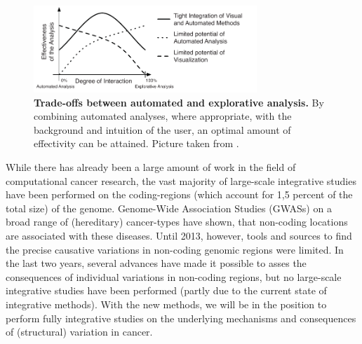\documentclass[twoside,fontsize=10pt]{article}
\begin{document}
\begin{figure}[H]
    \centering
    \includegraphics[width=0.75\textwidth]{autoVSexplo}
    \caption{\textbf{Trade-offs between automated and explorative analysis.} By combining automated analyses, where appropriate, with the background and intuition of the user, an optimal amount of effectivity can be attained. Picture taken from \citet{Keim}.}
    \label{fig:ae}
\end{figure}
\medskip

\noindent
While there has already been a large amount of work in the field of computational cancer research, the vast majority of large-scale integrative studies have been performed on the coding-regions (which account for 1,5 percent of the total size) of the genome\cite{ENCODE}. Genome-Wide Association Studies (GWASs) on a broad range of (hereditary) cancer-types have shown, that non-coding locations are associated with these diseases. Until 2013, however, tools and sources to find the precise causative variations in non-coding genomic regions were limited. In the last two years, several advances have made it possible to asses the consequences of individual variations in non-coding regions\cite{Ongen2014,Khurana2013}, but no large-scale integrative studies have been performed (partly due to the current state of integrative methods). With the new methods, we will be in the position to perform fully integrative studies on the underlying mechanisms and consequences of (structural) variation in cancer.
\end{document}

